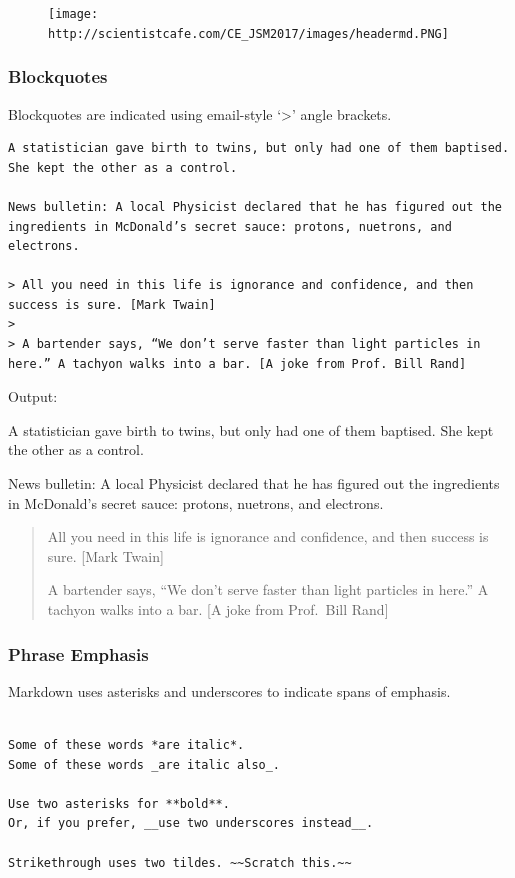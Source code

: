 \documentclass[]{book}
\theoremstyle{definition}
\theoremstyle{definition}
\theoremstyle{remark}
\begin{document}
\begin{figure}[htbp]
\centering
\texttt{[image: http://scientistcafe.com/CE\_JSM2017/images/headermd.PNG]}
\caption{}
\end{figure}

\subsubsection{Blockquotes}\label{blockquotes}

Blockquotes are indicated using email-style `\textgreater{}' angle
brackets.

\begin{verbatim}
A statistician gave birth to twins, but only had one of them baptised. She kept the other as a control.

News bulletin: A local Physicist declared that he has figured out the ingredients in McDonald’s secret sauce: protons, nuetrons, and electrons.

> All you need in this life is ignorance and confidence, and then success is sure. [Mark Twain]
> 
> A bartender says, “We don’t serve faster than light particles in here.” A tachyon walks into a bar. [A joke from Prof. Bill Rand]
\end{verbatim}

Output:

A statistician gave birth to twins, but only had one of them baptised.
She kept the other as a control.

News bulletin: A local Physicist declared that he has figured out the
ingredients in McDonald's secret sauce: protons, nuetrons, and
electrons.

\begin{quote}
All you need in this life is ignorance and confidence, and then success
is sure. {[}Mark Twain{]}

A bartender says, ``We don't serve faster than light particles in
here.'' A tachyon walks into a bar. {[}A joke from Prof.~Bill Rand{]}
\end{quote}

\subsubsection{Phrase Emphasis}\label{phrase-emphasis}

Markdown uses asterisks and underscores to indicate spans of emphasis.

\begin{verbatim}

Some of these words *are italic*.
Some of these words _are italic also_.

Use two asterisks for **bold**.
Or, if you prefer, __use two underscores instead__.

Strikethrough uses two tildes. ~~Scratch this.~~
\end{verbatim}
\end{document}
